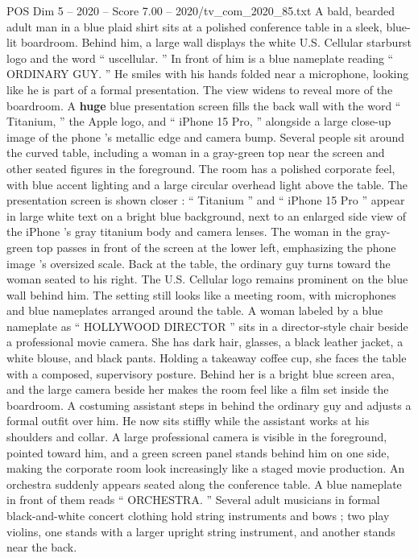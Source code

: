\begin{textsample}{POS Dim 5 – 2020 – Score 7.00 – 2020/tv\_com\_2020\_85.txt}  \label{ex:f5_pos_067}
A bald, bearded adult man in a blue plaid shirt sits at a polished conference table in a sleek, blue-lit boardroom.
Behind him, a large wall displays the white U.S.
Cellular starburst logo and the word “ uscellular. ” In front of him is a blue nameplate reading “ ORDINARY GUY. ” He smiles with his hands folded near a microphone, looking like he is part of a formal presentation.
The view widens to reveal more of the boardroom.
A \textbf{huge} blue presentation screen fills the back wall with the word “ Titanium, ” the Apple logo, and “ iPhone 15 Pro, ” alongside a large close-up image of the phone ’s metallic edge and camera bump.
Several people sit around the curved table, including a woman in a gray-green top near the screen and other seated figures in the foreground.
The room has a polished corporate feel, with blue accent lighting and a large circular overhead light above the table.
The presentation screen is shown closer : “ Titanium ” and “ iPhone 15 Pro ” appear in large white text on a bright blue background, next to an enlarged side view of the iPhone ’s gray titanium body and camera lenses.
The woman in the gray-green top passes in front of the screen at the lower left, emphasizing the phone image ’s oversized scale.
Back at the table, the ordinary guy turns toward the woman seated to his right.
The U.S.
Cellular logo remains prominent on the blue wall behind him.
The setting still looks like a meeting room, with microphones and blue nameplates arranged around the table.
A woman labeled by a blue nameplate as “ HOLLYWOOD DIRECTOR ” sits in a director-style chair beside a professional movie camera.
She has dark hair, glasses, a black leather jacket, a white blouse, and black pants.
Holding a takeaway coffee cup, she faces the table with a composed, supervisory posture.
Behind her is a bright blue screen area, and the large camera beside her makes the room feel like a film set inside the boardroom.
A costuming assistant steps in behind the ordinary guy and adjusts a formal outfit over him.
He now sits stiffly while the assistant works at his shoulders and collar.
A large professional camera is visible in the foreground, pointed toward him, and a green screen panel stands behind him on one side, making the corporate room look increasingly like a staged movie production.
An orchestra suddenly appears seated along the conference table.
A blue nameplate in front of them reads “ ORCHESTRA. ” Several adult musicians in formal black-and-white concert clothing hold string instruments and bows ; two play violins, one stands with a larger upright string instrument, and another stands near the back.

\end{textsample}
